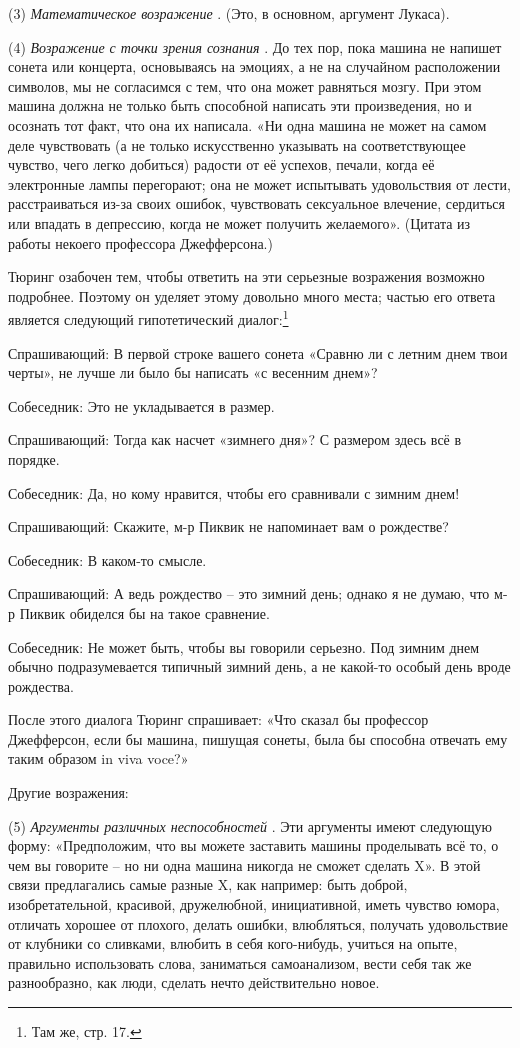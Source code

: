 \documentclass[../main.tex]{subfiles}
\begin{document}
(3) \emph{Математическое возражение} . (Это, в основном, аргумент Лукаса).

(4) \emph{Возражение с точки зрения сознания} . До тех пор, пока машина не напишет сонета или концерта, основываясь на эмоциях, а не на случайном расположении символов, мы не согласимся с тем, что она может равняться мозгу. При этом машина должна не только быть способной написать эти произведения, но и осознать тот факт, что она их написала. «Ни одна машина не может на самом деле чувствовать (а не только искусственно указывать на соответствующее чувство, чего легко добиться) радости от её успехов, печали, когда её электронные лампы перегорают; она не может испытывать удовольствия от лести, расстраиваться из-за своих ошибок, чувствовать сексуальное влечение, сердиться или впадать в депрессию, когда не может получить желаемого». (Цитата из работы некоего профессора Джефферсона.)

Тюринг озабочен тем, чтобы ответить на эти серьезные возражения возможно подробнее. Поэтому он уделяет этому довольно много места; частью его ответа является следующий гипотетический диалог:\footnote{Там же, стр. 17.}

Спрашивающий: В первой строке вашего сонета «Сравню ли с летним днем твои черты», не лучше ли было бы написать «с весенним днем»?

Собеседник: Это не укладывается в размер.

Спрашивающий: Тогда как насчет «зимнего дня»? С размером здесь всё в порядке.

Собеседник: Да, но кому нравится, чтобы его сравнивали с зимним днем!

Спрашивающий: Скажите, м-р Пиквик не напоминает вам о рождестве?

Собеседник: В каком-то смысле.

Спрашивающий: А ведь рождество \--- это зимний день; однако я не думаю, что м-р Пиквик обиделся бы на такое сравнение.

Собеседник: Не может быть, чтобы вы говорили серьезно. Под зимним днем обычно подразумевается типичный зимний день, а не какой-то особый день вроде рождества.

После этого диалога Тюринг спрашивает: «Что сказал бы профессор Джефферсон, если бы машина, пишущая сонеты, была бы способна отвечать ему таким образом in viva voce?»

Другие возражения:

(5) \emph{Аргументы различных неспособностей} . Эти аргументы имеют следующую форму: «Предположим, что вы можете заставить машины проделывать всё то, о чем вы говорите \--- но ни одна машина никогда не сможет сделать X». В этой связи предлагались самые разные X, как например: быть доброй, изобретательной, красивой, дружелюбной, инициативной, иметь чувство юмора, отличать хорошее от плохого, делать ошибки, влюбляться, получать удовольствие от клубники со сливками, влюбить в себя кого-нибудь, учиться на опыте, правильно использовать слова, заниматься самоанализом, вести себя так же разнообразно, как люди, сделать нечто действительно новое.
\end{document}
